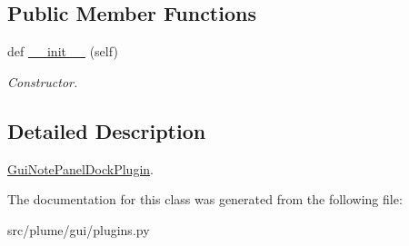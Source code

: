 \subsection*{Public Member Functions}
\begin{DoxyCompactItemize}
\item 
def \hyperlink{classplume-creator_1_1src_1_1plume_1_1gui_1_1plugins_1_1_gui_note_panel_dock_plugin_a9054ec78d1f723414e745ffa7b355068}{\+\_\+\+\_\+init\+\_\+\+\_\+} (self)\hypertarget{classplume-creator_1_1src_1_1plume_1_1gui_1_1plugins_1_1_gui_note_panel_dock_plugin_a9054ec78d1f723414e745ffa7b355068}{}\label{classplume-creator_1_1src_1_1plume_1_1gui_1_1plugins_1_1_gui_note_panel_dock_plugin_a9054ec78d1f723414e745ffa7b355068}

\begin{DoxyCompactList}\small\item\em Constructor. \end{DoxyCompactList}\end{DoxyCompactItemize}


\subsection{Detailed Description}
\hyperlink{classplume-creator_1_1src_1_1plume_1_1gui_1_1plugins_1_1_gui_note_panel_dock_plugin}{Gui\+Note\+Panel\+Dock\+Plugin}. 

The documentation for this class was generated from the following file\+:\begin{DoxyCompactItemize}
\item 
src/plume/gui/plugins.\+py\end{DoxyCompactItemize}
